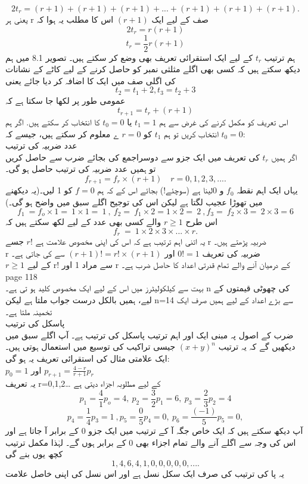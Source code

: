 \[ 2t_{r} = (r + 1) + (r + 1) + (r + 1) + ...  + (r + 1) + (r + 1) + (r + 1) .\]
یعنی ہر 
r
صف کے لیے ایک 
\((r+1)\)
اس کا مطلب یہ ہوا کہ
\[2t_{r}=r(r+1)\]
\[t_{r}=\frac{1}{2}r(r+1)\]
ہم ترتیب 
\(t_{r}\)
کے لیے ایک استقرائی تعریف بھی وضع کر سکتے ہیں۔ تصویر 8.1 میں ہم دیکھ سکتے ہیں کہ کسی بھی اگلے مثلثی نمبر کو حاصل کرنے کے لیے کاٹے کے نشانات کی اگلی صف میں ایک کا اضافہ کر دیا جائے یعنی
\[t_{2}=t_{1}+2, t_{3}=t_{2}+3\]
عمومی طور پر لکھا جا سکتا ہے کہ
\[t_{r+1}=t_{r}+(r+1)\]
اس تعریف کو مکمل کرنے کی غرض سے ہم 
\(t_{1}=1\)
یا
\(t_{0}=0\)
کا انتخاب کر سکتے ہیں.
اگر ہم 
\(t_{0}=0\)
انتخاب کریں تو ہم 
\(t_{1}\)
کو
\(r=0\)
ے معلوم کر سکتے ہیں، جیسے کہ:\\

عدد ضربیہ کی ترتیب\\
اگر ہمیں 
\(t_{r}\)
کی تعریف میں ایک جزو سے دوسراجمع کی بجائے ضرب سے حاصل کریں تو ہمیں عدد ضربیہ کی ترتیب حاصل ہو گی۔\\
\[f_{r+1} = f_{r} \times (r+1)\quad r =0,1,2,3, .... \]
یہاں ایک اہم نقطہ 
\(f_{0}\)
و 0لینا ہے (سوچئے!) بجائے اس کے کہ ہم
\(f=0\)
کو 
1
لیں۔(یہ دیکھنے میں تھوڑا عجیب لگتا ہے لیکن اس کی توجیح اگلے سبق میں واضح ہو گی۔)\\
\[f_{1}\ = f_{o} \times 1 =\ 1 \times 1 =\ 1\ ,\ f_{2} =\ f_{1} \times 2 = 1 \times 2 =\ 2\ , f_{3} =\  f_{2} \times 3 =\ 2 \times 3 = 6 \]
اس طرح 
\(r\ge 1\)
والے کسی بھی عدد کے لیے لکھ سکتے ہیں کہ\\
\[f_{r}\ =\ 1 \times 2 \times 3 \times  ... \times r. \]
یہ اتنی اہم ترتیب ہے کہ اس کی اپنی مخصوص علامت ہے
\(r!\)
جسے
r
ضربیہ پڑھتے ہیں۔\\
r
ضربیہ کی تعریف 
\(0!=1\)
اور
\((r+1)!=r!\times (r+1)\)
سے کی جاتی ہے۔\\
\(r\ge 1\)
کے لیے 
r!
سے مراد 
1
اور
r
کے درمیان آنے والے تمام قدرتی اعداد کا حاصل ضرب ہے۔\\
\clearpage
page 118 \\
بہت سے کیلکولیٹرز میں اس کے لیے ایک مخصوص کلید  ہو تی ہے۔
 n
  کی چھوٹی قیمتوں کے لیے، ہمیں بالکل درست جواب ملتا ہے لیکن
 n=14
    سے بڑے اعداد کے لیے ہمیں صرف ایک تخمینہ ملتا ہے۔\\
    پاسکل کی ترتیب\\
    ضرب کے اصول پہ مبنی ایک اور اہم ترتیب پاسکل کی ترتیب ہے۔  آپ اگلے سبق میں دیکھیں گے کہ یہ ترتیب 
\((x+y)^{n}\)
     جیسی تراکیب کی توسیع میں استعمال ہوتی ہیں۔ ایک علامتی مثال کی استقرائی تعریف یہ ہو گی:\\
     \( p_{0} =1\)
     اور
     \( p_{r+1} = \frac{4 - r}{r + 1}p_{r}\)\\
     یہ تعریف
 r=0,1,2…
       کے لیے مطلوبہ اجزاء دیتی ہے\\
       \[ p_{1} = \frac{4}{1} p_{o} = 4 , \: p_{2} = \frac{3}{2} p_{1} = 6 ,\: p_{3}= \frac{2}{3}p_{2} = 4 \]
\[ p_{4} = \frac{1}{4}p_{3} = 1 \: , p_{5} = \frac{0}{5}p_{4} = 0 , \: p_{6} =\frac{(-1)}{5}p_{5} = 0,\]
       آپ دیکھ سکتے ہیں کہ ایک خاص جگہ آ کے ترتیب میں ایک جزو 0 کے برابر آ جاتا ہے اور اس کی وجہ سے اگلے آنے والے تمام اجزاء بھی 0 کے برابر ہوں گے۔ لہٰذا مکمل ترتیب کچھ یوں بنے گی\\
 \[1 , 4 , 6 , 4 , 1 , 0 , 0 , 0 , 0 , 0 , ....\]
 یہ پا کی ترتیب کی صرف ایک سکل نسل ہے اور اس نسل کی اپنی خاصل علامت
 
